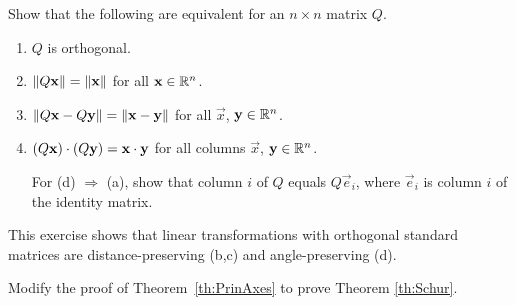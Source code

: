 \documentclass{ximera}
\begin{document}
\begin{problem}\label{prob:ortho25}
Show that the following are equivalent for an $n \times n$ matrix $Q$.


\begin{enumerate} 
\item $Q$ is orthogonal.

\item $\left\lVert Q\mathbf{x}\right\rVert = \left\lVert\mathbf{x}\right\rVert$ for all $\mathbf{x}\in\mathbb{R}^n$.

\item $\left\lVert Q\mathbf{x} - Q\mathbf{y}\right\rVert = \left\lVert\mathbf{x} - \mathbf{y}\right\rVert$ for all $\vec{x}$, $\mathbf{y}\in \mathbb{R}^n$.

\item $(Q\mathbf{x}) \cdot (Q\mathbf{y}) = \mathbf{x} \cdot \mathbf{y}$ for all columns $\vec{x}$, $\mathbf{y}\in\mathbb{R}^n$.

\begin{hint}
For (d) $\Rightarrow$ (a), show that column $i$ of $Q$ equals $Q\vec{e}_{i}$, where $\vec{e}_{i}$ is column $i$ of the identity matrix.
\end{hint}
\end{enumerate}

\begin{remark}
    This exercise shows that linear transformations with orthogonal standard matrices are distance-preserving (b,c) and angle-preserving (d).
\end{remark}

\end{problem}




\begin{problem}\label{prob:SchurChallenge}
Modify the proof of Theorem~\ref{th:PrinAxes} to prove Theorem \ref{th:Schur}.
\end{problem}
\end{document}
